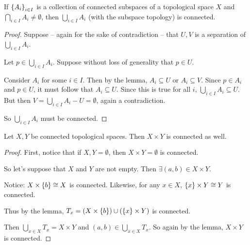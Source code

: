 \documentclass[12pt, twosided]{article}
\begin{document}
\begin{thm}
  If \(\left\{ A_i \right\}_{i \in I}\) is a collection of connected subspaces of a topological space \(X\) and \(\bigcap_{i \in I} A_i \neq \emptyset\), then \(\bigcup_{i \in I} A_i\) (with the subspace topology) is connected.
\end{thm}
\begin{proof}
  Suppose -- again for the sake of contradiction -- that \(U, V\) is a separation of \(\bigcup_{i \in I} A_i\).

  Let \(p \in \bigcup_{i \in I} A_i\). Suppose without loss of generality that \(p \in U\).

  Consider \(A_i\) for some \(i \in I\). Then by the lemma, \(A_i \subseteq U\) or \(A_i \subseteq V\). Since \(p \in A_i\) and \(p \in U\), it must follow that \(A_i \subseteq U\). Since this is true for all \(i\), \(\bigcup_{i \in I} A_i \subseteq U\). But then \(V = \bigcup_{i \in I} A_i - U = \emptyset\), again a contradiction.

  So \(\bigcup_{i \in I} A_i\) must be connected.
\end{proof}

\begin{thm}
  Let \(X, Y\) be connected topological spaces. Then \(X \times Y\) is connected as well.
\end{thm}

\begin{proof}
  First, notice that if \(X, Y = \emptyset\), then \(X \times Y = \emptyset\) is connected.

  So let's suppose that \(X\) and \(Y\) are not empty. Then \(\exists (a, b) \in X \times Y\).

  Notice: \(X \times \left\{ b \right\} \cong X\) is connected. Likewise, for any \(x \in X\), \(\left\{ x \right\} \times Y \cong Y\) is connected.

  Thus by the lemma, \(T_x = ( X \times \left\{ b \right\}) \cup (\left\{ x \right\} \times Y)\) is connected.

  Then \(\bigcup_{x \in X} T_x = X \times Y\) and \((a, b) \in \bigcup_{x \in X} T_x\). So again by the lemma, \(X \times Y\) is connected.
\end{proof}
\end{document}
